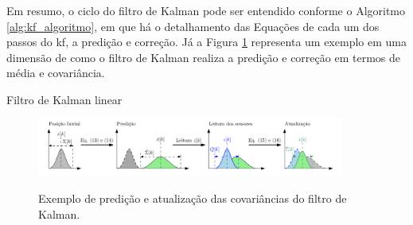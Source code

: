 \documentclass[acronym, symbols, table]{fei}
\begin{document}
				Em resumo, o ciclo do filtro de Kalman pode ser entendido conforme o Algoritmo \ref{alg:kf_algoritmo}, em que há o detalhamento das Equações de cada um dos passos do \acrshort{kf}, a predição e correção. Já a Figura \ref{fig:exemplo_filtro_de_kalman_covariancias} representa um exemplo em uma dimensão de como o filtro de Kalman realiza a predição e correção em termos de média e covariância.
				

				\begin{algorithm}
					\caption{Filtro de Kalman linear}\label{alg:kf_algoritmo}
				\end{algorithm}
			
				\begin{figure}[!htb]
					\centering
					\caption{Exemplo de predição e atualização das covariâncias do filtro de Kalman.}
					\includegraphics[width=0.9\textwidth]{exemplo_filtro_de_kalman.png}
					\label{fig:exemplo_filtro_de_kalman_covariancias}
				\end{figure}
		
\end{document}
